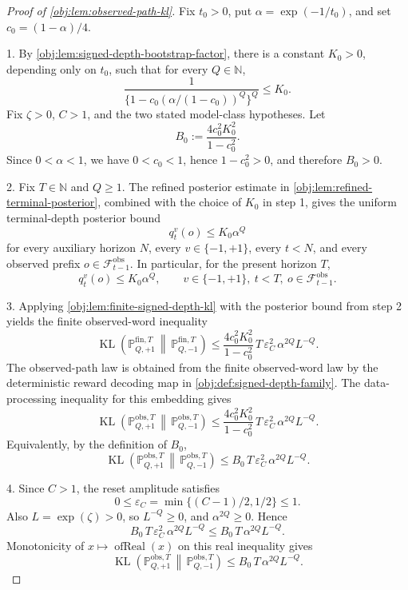 \begin{proof}[Proof of \cref{obj:lem:observed-path-kl}]
Fix \(t_0>0\), put \(\alpha=\exp(-1/t_0)\), and set \(c_0=(1-\alpha)/4\).

1.  By \cref{obj:lem:signed-depth-bootstrap-factor}, there is a constant \(K_0>0\), depending only on \(t_0\), such that for every \(Q\in\mathbb N\),
\[
\frac{1}{\{1-c_0(\alpha/(1-c_0))^Q\}^Q}\le K_0 .
\]
Fix \(\zeta>0\), \(C>1\), and the two stated model-class hypotheses. Let
\[
B_0:=\frac{4c_0^2K_0^2}{1-c_0^2}.
\]
Since \(0<\alpha<1\), we have \(0<c_0<1\), hence \(1-c_0^2>0\), and therefore \(B_0>0\). %

2.  Fix \(T\in\mathbb N\) and \(Q\ge1\). The refined posterior estimate in \cref{obj:lem:refined-terminal-posterior}, combined with the choice of \(K_0\) in step 1, gives the uniform terminal-depth posterior bound
\[
q_t^v(o)\le K_0\alpha^Q
\]
for every auxiliary horizon \(N\), every \(v\in\{-1,+1\}\), every \(t<N\), and every observed prefix \(o\in\mathcal F_{t-1}^{\mathrm{obs}}\). In particular, for the present horizon \(T\),
\[
q_t^v(o)\le K_0\alpha^Q,
\qquad
v\in\{-1,+1\},\ t<T,\ o\in\mathcal F_{t-1}^{\mathrm{obs}} .
\] %

3.  Applying \cref{obj:lem:finite-signed-depth-kl} with the posterior bound from step 2 yields the finite observed-word inequality
\[
\operatorname{KL}\!\left(
\mathbb P_{Q,+1}^{\mathrm{fin},T}
\,\middle\|\,
\mathbb P_{Q,-1}^{\mathrm{fin},T}
\right)
\le
\frac{4c_0^2K_0^2}{1-c_0^2}\,
T\,\varepsilon_C^2\,\alpha^{2Q}L^{-Q}.
\]
The observed-path law is obtained from the finite observed-word law by the deterministic reward decoding map in \cref{obj:def:signed-depth-family}. The data-processing inequality for this embedding gives
\[
\operatorname{KL}\!\left(
\mathbb P_{Q,+1}^{\mathrm{obs},T}
\,\middle\|\,
\mathbb P_{Q,-1}^{\mathrm{obs},T}
\right)
\le
\frac{4c_0^2K_0^2}{1-c_0^2}\,
T\,\varepsilon_C^2\,\alpha^{2Q}L^{-Q}.
\]
Equivalently, by the definition of \(B_0\),
\[
\operatorname{KL}\!\left(
\mathbb P_{Q,+1}^{\mathrm{obs},T}
\,\middle\|\,
\mathbb P_{Q,-1}^{\mathrm{obs},T}
\right)
\le
B_0\,T\,\varepsilon_C^2\,\alpha^{2Q}L^{-Q}.
\] %

4.  Since \(C>1\), the reset amplitude satisfies
\[
0\le \varepsilon_C=\min\{(C-1)/2,1/2\}\le 1 .
\]
Also \(L=\exp(\zeta)>0\), so \(L^{-Q}\ge0\), and \(\alpha^{2Q}\ge0\). Hence
\[
B_0\,T\,\varepsilon_C^2\,\alpha^{2Q}L^{-Q}
\le
B_0\,T\,\alpha^{2Q}L^{-Q}.
\]
Monotonicity of \(x\mapsto \operatorname{ofReal}(x)\) on this real inequality gives
\[
\operatorname{KL}\!\left(
\mathbb P_{Q,+1}^{\mathrm{obs},T}
\,\middle\|\,
\mathbb P_{Q,-1}^{\mathrm{obs},T}
\right)
\le
B_0\,T\,\alpha^{2Q}L^{-Q}.
\] %


\end{proof}
